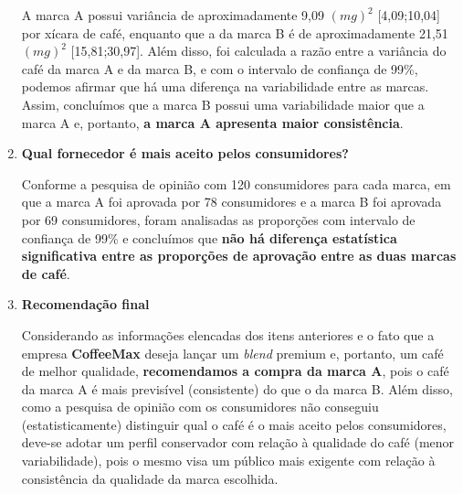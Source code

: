 \documentclass[11pt]{article}
\begin{document}
\begin{enumerate}
    A marca A possui variância de aproximadamente 9,09 $(mg)^2$ [4,09;10,04] por
    xícara de café, enquanto que a da marca B é de aproximadamente 21,51
    $(mg)^2$ [15,81;30,97]. Além disso, foi calculada a razão entre a variância
    do café da marca A e da marca B, e com o intervalo de confiança de 99\%,
    podemos afirmar que há uma diferença na variabilidade entre as marcas.
    Assim, concluímos que a marca B possui uma variabilidade maior que a marca A
    e, portanto, \textbf{a marca A apresenta maior consistência}.

    \item \textbf{Qual fornecedor é mais aceito pelos consumidores?}

    Conforme a pesquisa de opinião com 120 consumidores para cada marca, em que
    a marca A foi aprovada por 78 consumidores e a marca B foi aprovada por 69
    consumidores, foram analisadas as proporções com intervalo de confiança de
    99\% e concluímos que \textbf{não há diferença estatística significativa
    entre as proporções de aprovação entre as duas marcas de café}.

    \item \textbf{Recomendação final}

    Considerando as informações elencadas dos itens anteriores e o fato que a
    empresa \textbf{CoffeeMax} deseja lançar um \textit{blend} premium e,
    portanto, um café de melhor qualidade, \textbf{recomendamos a compra da
    marca A}, pois o café da marca A é mais previsível (consistente) do que o da
    marca B. Além disso, como a pesquisa de opinião com os consumidores não
    conseguiu (estatisticamente) distinguir qual o café é o mais aceito pelos
    consumidores, deve-se adotar um perfil conservador com relação à qualidade
    do café (menor variabilidade), pois o mesmo visa um público mais exigente
    com relação à consistência da qualidade da marca escolhida.
\end{enumerate}
\end{document}
